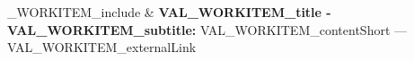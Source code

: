 %
\ifVAL_WORKITEM_include%
        & \textbf{VAL_WORKITEM_title - VAL_WORKITEM_subtitle:}%
        VAL_WORKITEM_contentShort%
        --- VAL_WORKITEM_externalLink%
        \\%
        \fi%
